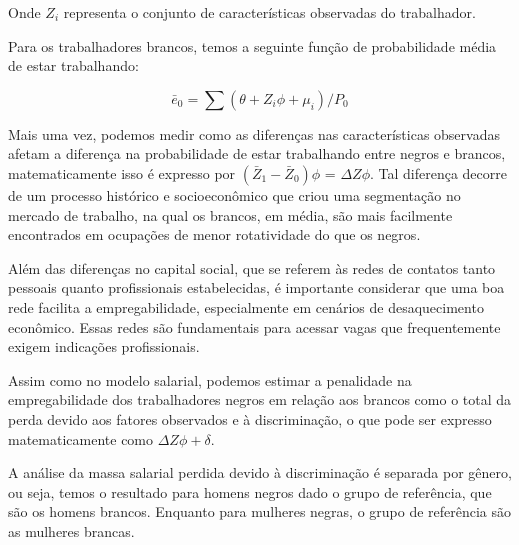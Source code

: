 \documentclass{article}
\begin{document}
	Onde  $ Z_{i}$ representa o conjunto de características observadas do trabalhador. \newline
	
	Para os trabalhadores brancos, temos a seguinte função de probabilidade média de estar trabalhando:
	
	\begin{equation}
		\bar{e}_{0} = \sum (\theta + Z_{i}\phi + \mu_{i})/ P_{0}
	\end{equation}
	
	Mais uma vez, podemos medir como as diferenças nas características observadas afetam a diferença na probabilidade de estar trabalhando entre negros e brancos, matematicamente isso é expresso por $(\bar{Z}_{1} - \bar{Z}_{0})\phi$ = $\Delta Z\phi$. Tal diferença decorre de um processo histórico e socioeconômico que criou uma segmentação no mercado de trabalho, na qual os brancos, em média, são mais facilmente encontrados em ocupações de menor rotatividade do que os negros. \newline
	
	Além das diferenças no capital social, que se referem às redes de contatos tanto pessoais quanto profissionais estabelecidas, é importante considerar que uma boa rede facilita a empregabilidade, especialmente em cenários de desaquecimento econômico. Essas redes são fundamentais para acessar vagas que frequentemente exigem indicações profissionais. \newline
	
	Assim como no modelo salarial, podemos estimar a penalidade na empregabilidade dos trabalhadores negros em relação aos brancos como o total da perda devido aos fatores observados e à discriminação, o que pode ser expresso matematicamente como $\Delta Z\phi + \delta$. \newline
	
	A análise da massa salarial perdida devido à discriminação é separada por gênero, ou seja, temos o resultado para homens negros dado o grupo de referência, que são os homens brancos. Enquanto para mulheres negras, o grupo de referência são as mulheres brancas. 
	
\end{document}

